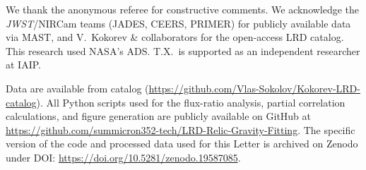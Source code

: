 \documentclass[apjl,twocolumn,longbibliography,linenumbers]{aastex701}
\begin{document}
\begin{acknowledgments}
We thank the anonymous referee for constructive comments.
We acknowledge the \textit{JWST}/NIRCam teams (JADES, CEERS, PRIMER)
for publicly available data via MAST, and V.\ Kokorev \& collaborators
for the open-access LRD catalog.
This research used NASA's ADS. T.X.\ is supported as an independent researcher at IAIP.
\end{acknowledgments}




Data are available from \cite{Kokorev2024} catalog
(\url{https://github.com/Vlas-Sokolov/Kokorev-LRD-catalog}).
All Python scripts used for the flux-ratio analysis, partial correlation
calculations, and figure generation are publicly available on GitHub at
\url{https://github.com/summicron352-tech/LRD-Relic-Gravity-Fitting}.
The specific version of the code and processed data used for this Letter is
archived on Zenodo under DOI: \url{https://doi.org/10.5281/zenodo.19587085}.





\FloatBarrier

\nolinenumbers
\end{document}

